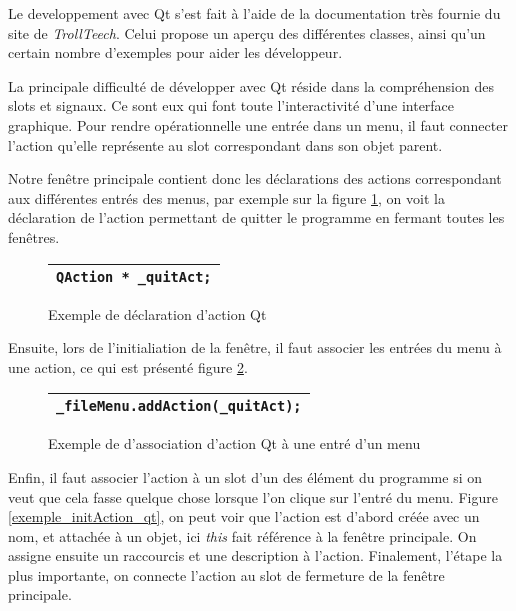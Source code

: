 \par
Le developpement avec Qt s'est fait \`a l'aide de la documentation tr\`es fournie du site de \textit{TrollTeech}. Celui propose un aper\c cu des diff\'erentes classes, ainsi qu'un certain nombre d'exemples pour aider les d\'eveloppeur.
\par
La principale difficult\'e de d\'evelopper avec Qt r\'eside dans la compr\'ehension des slots et signaux. Ce sont eux qui font toute l'interactivit\'e d'une interface graphique. Pour rendre op\'erationnelle une entr\'ee dans un menu, il faut connecter l'action qu'elle repr\'esente au slot correspondant dans son objet parent.
\par
Notre fen\^etre principale contient donc les d\'eclarations des actions correspondant aux diff\'erentes entr\'es des menus, par exemple sur la figure \ref{exemple_action_qt}, on voit la d\'eclaration de l'action permettant de quitter le programme en fermant toutes les fen\^etres.
\begin{figure}[H]
   \begin{center}
      \begin{tabular}{l}
         \hline
         \verb|QAction * _quitAct;|\\
         \hline
      \end{tabular}
   \end{center}
\caption{\label{exemple_action_qt} Exemple de d\'eclaration d'action Qt}
\end{figure}
Ensuite, lors de l'initialiation de la fen\^etre, il faut associer les 
entr\'ees du menu \`a une action, ce qui est pr\'esent\'e figure \ref{exemple_menu_qt}.

\begin{figure}[H]
   \begin{center}
      \begin{tabular}{l}
         \hline
         \verb|_fileMenu.addAction(_quitAct);|\\
         \hline
      \end{tabular}
   \end{center}
\caption{\label{exemple_menu_qt} Exemple de d'association d'action Qt \`a une entr\'e d'un menu}
\end{figure}

Enfin, il faut associer l'action \`a un slot d'un des \'el\'ement du programme si on veut que cela fasse quelque chose lorsque l'on clique sur l'entr\'e du menu. Figure \ref{exemple_initAction_qt}, on peut voir que l'action est d'abord cr\'e\'ee avec un nom, et attach\'ee \`a un objet, ici \textit{this} fait r\'ef\'erence \`a la fen\^etre principale. On assigne ensuite un raccourcis et une description \`a l'action. Finalement, l'\'etape la plus importante, on connecte l'action au slot de fermeture de la fen\^etre principale.

